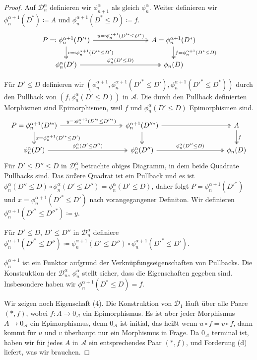 \documentclass[a4paper, parskip=half,11pt]{scrartcl}
\theoremstyle{marginbreak}
\theoremstyle{nonumberplain}
\newtheorem{proof}{Beweis.}
\newcommand\cat\mathcal
\newcommand{\n}{\pgfmatrixnextcell}
\begin{document}
{\begin{proof}
			Auf $\cat{D}_n^\alpha$ definieren wir $\phi_{n+1}^\alpha$ als gleich
			$\phi_n^\alpha$. Weiter definieren wir $\phi_n^{\alpha+1}(D^*)\coloneqq A$
			und $\phi_n^{\alpha+1}(D^*\leq D)\coloneqq f$.
			\[
				\begin{tikzcd}[column sep=8em]
					P \eqqcolon \phi_n^{\alpha+1}(D'^*)
						\ar[two heads]{d}{v\eqqcolon \phi_n^{\alpha + 1}(D'^*\leq D')}
						\ar[two heads]{r}{u\eqqcolon \phi_n^{\alpha+1}(D'^*\leq D^*)}
					\n A=\phi_n^{\alpha+1}(D^*)
						\ar[two heads]{d}{f = \phi_n^{\alpha+1}(D^*\leq D)}\\
					\phi_n^\alpha(D') \ar[two heads]{r}{\phi_n^\alpha(D'\leq D)} \n \phi_n(D)
				\end{tikzcd}
			\]

			Für $D'\leq D$ definieren wir $(\phi_n^{\alpha+1}, \phi_n^{\alpha+1}(D'^*\leq D'),
			\phi_n^{\alpha+1}(D'^*\leq D^*))$ durch den Pullback
			von $(f, \phi_n^\alpha(D'\leq D))$ in $\cat{A}$. Die durch den Pullback
			definierten Morphismen sind Epimorphismen, weil $f$ und $\phi_n^\alpha(D'\leq D)$
			Epimorphismen sind.
			\[
				\begin{tikzcd}[column sep=9em]
					P=\phi_n^{\alpha+1}(D'^*)
						\ar[two heads]{d}{x=\phi_n^{\alpha+1}(D'^*\leq D')}
						\ar[two heads]{r}{y\eqqcolon \phi_n^{\alpha+1}(D'^*\leq D''^*)} \n
					\phi_n^{\alpha+1}(D''^*)
						\ar[two heads]{d}{}
						\ar[two heads]{r}{} \n
					A
						\ar[two heads]{d}{f} \\
					\phi_n^\alpha(D')
						\ar[two heads]{r}{\phi_n^\alpha(D'\leq D'')} \n
					\phi_n^\alpha(D'')
						\ar[two heads]{r}{\phi_n^\alpha(D''\leq D)} \n
					\phi_n(D)
				\end{tikzcd}
			\]
			Für $D'\leq D''\leq D$ in $\cat{D}_n^\alpha$ betrachte obiges Diagramm,
			in dem beide Quadrate Pullbacks sind. Das äußere Quadrat ist ein Pullback
			und es ist $\phi_n^\alpha(D''\leq D)\circ\phi_n^\alpha(D'\leq D'')=\phi_n^\alpha(D'\leq D)$,
			daher folgt $P=\phi_n^{\alpha+1}(D'^*)$
			und $x=\phi_n^{\alpha+1}(D'^*\leq D')$
			nach vorangegangener Definiton. Wir definieren $\phi_n^{\alpha+1}(D'^*\leq D''^*)\coloneqq y$.

			Für $D'\leq D$, $D'\leq D''$ in $\cat{D}_n^\alpha$ definiere
			$\phi_n^{\alpha+1}(D'^*\leq D'')\coloneqq \phi_n^{\alpha+1}(D'\leq D'')
			\circ\phi_n^{\alpha+1}(D'^*\leq D')$.

			$\phi_n^{\alpha+1}$ ist ein Funktor aufgrund der Verknüpfungseigenschaften
			von Pullbacks.
			Die Konstruktion der $\cat{D}_n^\alpha$, $\phi_n^\alpha$ stellt sicher,
			dass die Eigenschaften gegeben sind. Insbesondere haben wir
			$\phi_n^{\alpha+1}(D^*\leq D)=f$.

			Wir zeigen noch Eigenschaft (4). Die Konstruktion von $\cat{D}_1$ läuft
			über alle Paare $(*, f)$, wobei $f\colon A\to 0_\cat{A}$ ein Epimorphismus.
			Es ist aber jeder Morphismus $A\to 0_\cat{A}$ ein Epimorphismus, denn
			$0_\cat{A}$ ist initial, das heißt wenn $u\circ f=v\circ f$, dann kommt für $u$ und $v$
			überhaupt nur ein Morphismus in Frage. Da $0_\cat{A}$ terminal ist,
			haben wir für jedes $A$ in $\cat{A}$ ein entsprechendes Paar $(*, f)$,
			und Forderung (d) liefert, was wir brauchen.
		\end{proof}}
\end{document}
